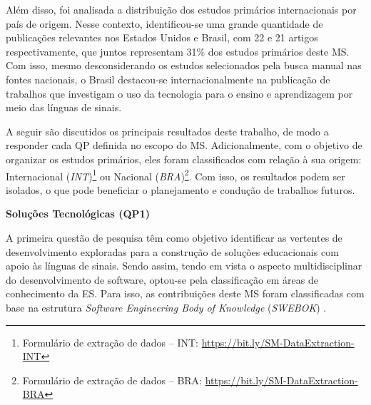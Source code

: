 Além disso, foi analisada a distribuição dos estudos primários internacionais por país de origem. Nesse contexto, identificou-se uma grande quantidade de publicações relevantes nos Estados Unidos e Brasil, com 22 e 21 artigos respectivamente, que juntos representam 31\% dos estudos primários deste MS. Com isso, mesmo desconsiderando os estudos selecionados pela busca manual nas fontes nacionais, o Brasil destacou-se internacionalmente na publicação de trabalhos que investigam o uso da tecnologia para o ensino e aprendizagem por meio das línguas de sinais.


A seguir são discutidos os principais resultados deste trabalho, de modo a responder cada QP definida no escopo do MS. Adicionalmente, com o objetivo de organizar os estudos primários, eles foram classificados com relação à sua origem: Internacional (\textit{INT})\footnote{Formulário de extração de dados --  INT: \url{https://bit.ly/SM-DataExtraction-INT}} ou Nacional (\textit{BRA})\footnote{Formulário de extração de dados --  BRA: \url{https://bit.ly/SM-DataExtraction-BRA}}. Com isso, os resultados podem ser isolados, o que pode beneficiar o planejamento e condução de trabalhos futuros.

\noindent
\textbf{Soluções Tecnológicas (QP1)}


A primeira questão de pesquisa têm como objetivo identificar as vertentes de desenvolvimento exploradas para a construção de soluções educacionais com apoio às línguas de sinais. Sendo assim, tendo em vista o aspecto multidisciplinar do desenvolvimento de software, optou-se pela classificação em áreas de conhecimento da ES. Para isso, as contribuições deste MS foram classificadas com base na estrutura \textit{Software Engineering Body of Knowledge} (\textit{SWEBOK}) \cite{Bourque2014, Petersen2015}.

